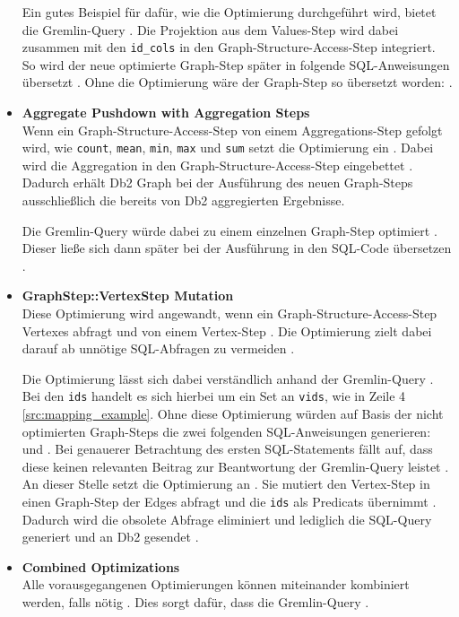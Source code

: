 \begin{itemize}
    Ein gutes Beispiel für dafür, wie die Optimierung durchgeführt wird, bietet die Gremlin-Query . Die Projektion aus dem Values-Step wird dabei zusammen mit den \texttt{id\_cols} in den Graph-Structure-Access-Step integriert. So wird der neue optimierte Graph-Step später in folgende SQL-Anweisungen übersetzt . Ohne die Optimierung wäre der Graph-Step so übersetzt worden: .

    \item \textbf{Aggregate Pushdown with Aggregation Steps}\\
    Wenn ein Graph-Structure-Access-Step von einem Aggregations-Step gefolgt wird, wie \texttt{count}, \texttt{mean}, \texttt{min}, \texttt{max} und \texttt{sum} setzt die Optimierung ein \cite{sigmod_tian}. Dabei wird die Aggregation in den Graph-Structure-Access-Step eingebettet \cite{sigmod_tian}. Dadurch erhält Db2 Graph bei der Ausführung des neuen Graph-Steps ausschließlich die bereits von Db2 aggregierten Ergebnisse.
    
    Die Gremlin-Query  würde dabei zu einem einzelnen Graph-Step optimiert \cite{sigmod_tian}. Dieser ließe sich dann später bei der Ausführung in den SQL-Code  übersetzen \cite{sigmod_tian}.

    \item \textbf{GraphStep::VertexStep Mutation}\\
    Diese Optimierung wird angewandt, wenn ein Graph-Structure-Access-Step Vertexes abfragt und von einem Vertex-Step \cite{sigmod_tian}. Die Optimierung zielt dabei darauf ab unnötige SQL-Abfragen zu vermeiden \cite{sigmod_tian}. 

    Die Optimierung lässt sich dabei verständlich anhand der Gremlin-Query  \cite{sigmod_tian}. Bei den \texttt{ids} handelt es sich hierbei um ein Set an \texttt{vids}, wie in Zeile 4 \autoref{src:mapping_example}. Ohne diese Optimierung würden auf Basis der nicht optimierten Graph-Steps die zwei folgenden SQL-Anweisungen generieren:  und  \cite{sigmod_tian}. Bei genauerer Betrachtung des ersten SQL-Statements fällt auf, dass diese keinen relevanten Beitrag zur Beantwortung der Gremlin-Query leistet \cite{sigmod_tian}. An dieser Stelle setzt die Optimierung an \cite{sigmod_tian}. Sie mutiert den Vertex-Step in einen Graph-Step der Edges abfragt und die \texttt{ids} als Predicats übernimmt \cite{sigmod_tian}. Dadurch wird die obsolete Abfrage eliminiert und lediglich die SQL-Query  generiert und an Db2 gesendet \cite{sigmod_tian}.

    \item \textbf{Combined Optimizations}\\
    Alle vorausgegangenen Optimierungen können miteinander kombiniert werden, falls nötig \cite{sigmod_tian}. Dies sorgt dafür, dass die Gremlin-Query  .
\end{itemize}

